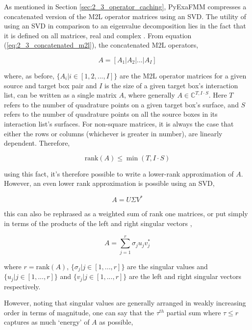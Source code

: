 As mentioned in Section \ref{sec:2_3_operator_caching}, \gls{PyExaFMM} compresses
a concatenated version of the \gls{M2L} operator matrices using an \gls{SVD}.
The utility of using an SVD in comparison to an eigenvalue decomposition lies
in the fact that it is defined on all matrices, real and complex
\cite{Trefethen:1997:SIAM}. From equation (\ref{eq:2_3_concatenated_m2l}), the
concatenated M2L operators,

\begin{equation}
    A = \left [ A_1 | A_2 | ... | A_I \right]
    \label{eq:2_4_concatenated_m2l}
\end{equation}

where, as before, $\{A_i | i \in [1, 2, ..., I]\}$ are the M2L operator matrices
for a given source and target box pair and $I$ is the size of a given target box's
interaction list, can be written as a single matrix $A$, where generally
$A \in \mathbb{C}^{T, I \cdot S}$. Here $T$ refers to the number of quadrature
points on a given target box's surface, and $S$ refers to the number of quadrature
points on all the source boxes in its interaction list's surfaces. For non-square
matrices, it is always the case that either the rows or columns (whichever is
greater in number), are linearly dependent. Therefore,

\begin{equation}
    \text{rank}(A) \leq \min (T, I \cdot S)
\end{equation}

using this fact, it's therefore possible to write a lower-rank approximation of $A$.
However, an even lower rank approximation is possible using an SVD,

\begin{equation}
    A = U \Sigma V^*
\end{equation}

this can also be rephrased as a weighted sum of rank one matrices, or put simply
in terms of the products of the left and right singular vectors \cite{Trefethen:1997:SIAM},

\begin{equation}
    A = \sum_{j=1}^{r}\sigma_j u_j v_j^*
\end{equation}

where $r = \text{rank} (A)$, $\{\sigma_j | j \in [1, ..., r] \}$ are the singular
values and $\{u_j | j \in [1, ..., r] \} $ and $\{v_j | j \in [1, ..., r] \}$
are the left and right singular vectors respectively.

However, noting that singular values are generally arranged in weakly increasing
order in terms of magnitude, one can say that the $\tau^{th}$ partial sum where
$\tau \leq r$ captures as much `energy' of $A$ as possible,

